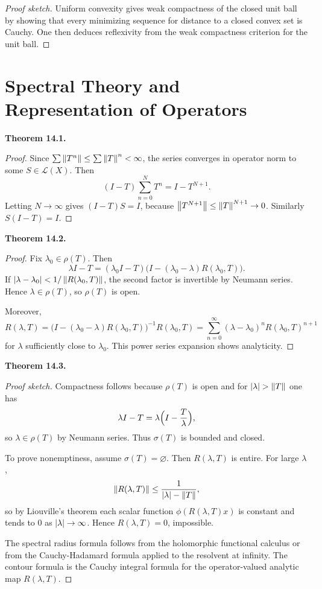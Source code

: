 \documentclass[11pt]{article}
\newenvironment{theoremstmt}[1]{%
  \par\medskip\noindent\textbf{Theorem #1. }\itshape
}{\par\medskip}
\begin{document}
\begin{proof}[Proof sketch]
Uniform convexity gives weak compactness of the closed unit ball by showing that every minimizing sequence for distance to a closed convex set is Cauchy. One then deduces reflexivity from the weak compactness criterion for the unit ball.
\end{proof}

\section{Spectral Theory and Representation of Operators}

\begin{theoremstmt}{14.1}
\thmNeumannSeries
\end{theoremstmt}

\begin{proof}
Since $\sum \left\lVert T^n\right\rVert\le \sum \left\lVert T\right\rVert^n<\infty$, the series converges in operator norm to some $S\in\mathcal L(X)$. Then
\[
(I-T)\sum_{n=0}^N T^n=I-T^{N+1}.
\]
Letting $N\to\infty$ gives $(I-T)S=I$, because $\left\lVert T^{N+1}\right\rVert\le \left\lVert T\right\rVert^{N+1}\to 0$. Similarly $S(I-T)=I$.
\end{proof}

\begin{theoremstmt}{14.2}
\thmResolventAnalytic
\end{theoremstmt}

\begin{proof}
Fix $\lambda_0\in\rho(T)$. Then
\[
\lambda I-T=(\lambda_0 I-T)\bigl(I-(\lambda_0-\lambda)R(\lambda_0,T)\bigr).
\]
If $\left\lvert \lambda-\lambda_0\right\rvert<1/\left\lVert R(\lambda_0,T)\right\rVert$, the second factor is invertible by Neumann series. Hence $\lambda\in\rho(T)$, so $\rho(T)$ is open.

Moreover,
\[
R(\lambda,T)=\bigl(I-(\lambda_0-\lambda)R(\lambda_0,T)\bigr)^{-1}R(\lambda_0,T)
=\sum_{n=0}^{\infty}(\lambda-\lambda_0)^n R(\lambda_0,T)^{n+1}
\]
for $\lambda$ sufficiently close to $\lambda_0$. This power series expansion shows analyticity.
\end{proof}

\begin{theoremstmt}{14.3}
\thmSpectralRadius
\end{theoremstmt}

\begin{proof}[Proof sketch]
Compactness follows because $\rho(T)$ is open and for $\left\lvert \lambda\right\rvert>\left\lVert T\right\rVert$ one has
\[
\lambda I-T=\lambda\Bigl(I-\frac{T}{\lambda}\Bigr),
\]
so $\lambda\in\rho(T)$ by Neumann series. Thus $\sigma(T)$ is bounded and closed.

To prove nonemptiness, assume $\sigma(T)=\varnothing$. Then $R(\lambda,T)$ is entire. For large $\lambda$,
\[
\left\lVert R(\lambda,T)\right\rVert\le \frac{1}{\left\lvert \lambda\right\rvert-\left\lVert T\right\rVert},
\]
so by Liouville's theorem each scalar function $\phi(R(\lambda,T)x)$ is constant and tends to $0$ as $\left\lvert \lambda\right\rvert\to\infty$. Hence $R(\lambda,T)=0$, impossible.

The spectral radius formula follows from the holomorphic functional calculus or from the Cauchy-Hadamard formula applied to the resolvent at infinity. The contour formula is the Cauchy integral formula for the operator-valued analytic map $R(\lambda,T)$.
\end{proof}
\end{document}
